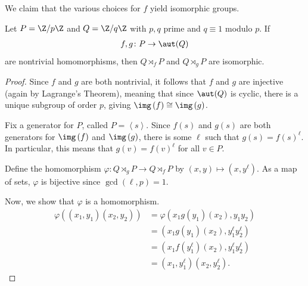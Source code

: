 \documentclass[10pt]{mypackage}
\begin{document}
We claim that the various choices for $f$ yield isomorphic groups.
\begin{proposition}
  Let $P = \Z/p\Z$ and $Q = \Z/q\Z$ with $p,q$ prime and $q\equiv 1$ modulo $p$. If
  \begin{align*}
    f,g\colon P\rightarrow \aut(Q)
  \end{align*}
  are nontrivial homomorphisms, then $Q\rtimes_{f}P$ and $Q\rtimes_{g}P$ are isomorphic.
\end{proposition}
\begin{proof}
  Since $f$ and $g$ are both nontrivial, it follows that $f$ and $g$ are injective (again by Lagrange's Theorem), meaning that since $\aut(Q)$ is cyclic, there is a unique subgroup of order $p$, giving $\img\left( f \right)\cong \img\left( g \right)$.%

  Fix a generator for $P$, called $ P = \left\langle s \right\rangle $. Since $f(s)$ and $g(s)$ are both generators for $\img\left( f \right)$ and $\img\left( g \right)$, there is some $\ell$ such that $g(s) = f(s)^{\ell}$. In particular, this means that $g(v) = f(v)^{\ell}$ for all $v\in P$.%

  Define the homomorphism $\varphi\colon Q\rtimes_{g}P\rightarrow Q\rtimes_{f}P$ by $\left( x,y \right)\mapsto \left( x,y^{\ell} \right)$. As a map of sets, $\varphi$ is bijective since $\gcd\left( \ell,p \right) = 1$.%

  Now, we show that $\varphi$ is a homomorphism.
  \begin{align*}
    \varphi\left( \left( x_1,y_1 \right)\left( x_2,y_2 \right) \right) &= \varphi\left( x_1g\left( y_1 \right)\left( x_2 \right),y_1y_2 \right)\\
                                                                       &= \left( x_1g\left( y_1 \right)\left( x_2 \right),y_1^{\ell}y_2^{\ell} \right)\\
                                                                       &= \left( x_1f\left( y_1^{\ell} \right)\left( x_2 \right),y_1^{\ell}y_2^{\ell} \right)\\
                                                                       &= \left( x_1,y_1^{\ell} \right)\left( x_2,y_2^{\ell} \right).
  \end{align*}
\end{proof}
\end{document}
